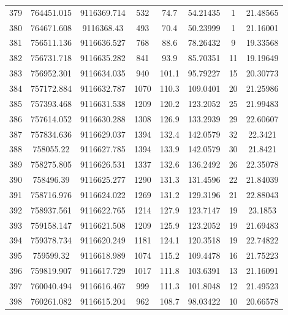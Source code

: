 \begin{longtable}{cccccccc}
379  & 764451.015      & 9116369.714      & 532     & 74.7  & 54.21435 & 1  & 21.48565 \\
380  & 764671.608      & 9116368.43       & 493     & 70.4  & 50.23999 & 1  & 21.16001 \\
381  & 756511.136      & 9116636.527      & 768     & 88.6  & 78.26432 & 9  & 19.33568 \\
382  & 756731.718      & 9116635.282      & 841     & 93.9  & 85.70351 & 11 & 19.19649 \\
383  & 756952.301      & 9116634.035      & 940     & 101.1 & 95.79227 & 15 & 20.30773 \\
384  & 757172.884      & 9116632.787      & 1070    & 110.3 & 109.0401 & 20 & 21.25986 \\
385  & 757393.468      & 9116631.538      & 1209    & 120.2 & 123.2052 & 25 & 21.99483 \\
386  & 757614.052      & 9116630.288      & 1308    & 126.9 & 133.2939 & 29 & 22.60607 \\
387  & 757834.636      & 9116629.037      & 1394    & 132.4 & 142.0579 & 32 & 22.3421  \\
388  & 758055.22       & 9116627.785      & 1394    & 133.9 & 142.0579 & 30 & 21.8421  \\
389  & 758275.805      & 9116626.531      & 1337    & 132.6 & 136.2492 & 26 & 22.35078 \\
390  & 758496.39       & 9116625.277      & 1290    & 131.3 & 131.4596 & 22 & 21.84039 \\
391  & 758716.976      & 9116624.022      & 1269    & 131.2 & 129.3196 & 21 & 22.88043 \\
392  & 758937.561      & 9116622.765      & 1214    & 127.9 & 123.7147 & 19 & 23.1853  \\
393  & 759158.147      & 9116621.508      & 1209    & 125.9 & 123.2052 & 19 & 21.69483 \\
394  & 759378.734      & 9116620.249      & 1181    & 124.1 & 120.3518 & 19 & 22.74822 \\
395  & 759599.32       & 9116618.989      & 1074    & 115.2 & 109.4478 & 16 & 21.75223 \\
396  & 759819.907      & 9116617.729      & 1017    & 111.8 & 103.6391 & 13 & 21.16091 \\
397  & 760040.494      & 9116616.467      & 999     & 111.3 & 101.8048 & 12 & 21.49523 \\
398  & 760261.082      & 9116615.204      & 962     & 108.7 & 98.03422 & 10 & 20.66578 \\

\end{longtable}
